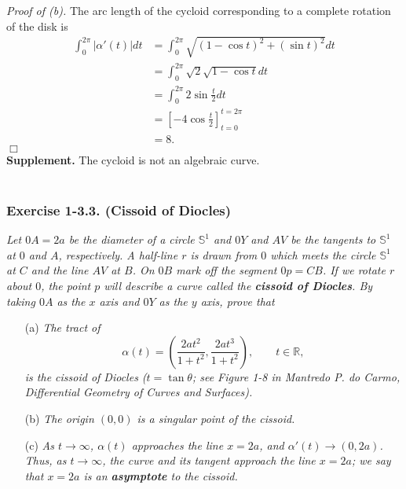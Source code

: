\documentclass{article}
\begin{document}
\emph{Proof of (b).}
The arc length of the cycloid corresponding to a complete rotation of the disk is
\begin{align*}
  \int_{0}^{2\pi} |\alpha'(t)| dt
  &= \int_{0}^{2\pi} \sqrt{(1-\cos t)^2 + (\sin t)^2} dt \\
  &= \int_{0}^{2\pi} \sqrt{2} \sqrt{1 - \cos t} dt \\
  &= \int_{0}^{2\pi} 2 \sin \frac{t}{2} dt \\
  &= \left[ -4 \cos\frac{t}{2} \right]_{t=0}^{t=2\pi} \\
  &= 8.
\end{align*}
$\Box$ \\

\textbf{Supplement.}
The cycloid is not an algebraic curve. \\\\






\subsubsection*{Exercise 1-3.3. (Cissoid of Diocles)}
\emph{Let $0A = 2a$ be the diameter of a circle $\mathbb{S}^1$ and
$0Y$ and $AV$ be the tangents to $\mathbb{S}^1$ at $0$ and $A$, respectively.
A half-line $r$ is drawn from $0$ which
meets the circle $\mathbb{S}^1$ at $C$ and the line $AV$ at $B$.
On $0B$ mark off the segment $0p = CB$.
If we rotate $r$ about $0$, the point $p$ will describe a curve called
the \textbf{cissoid of Diocles}.
By taking $0A$ as the $x$ axis and $0Y$ as the $y$ axis, prove that}
\begin{enumerate}
\item[(a)]
  \emph{The tract of
  \[
    \alpha(t) = \left( \frac{2at^2}{1+t^2}, \frac{2at^3}{1+t^2} \right),
    \qquad
    t \in \mathbb{R},
  \]
  is the cissoid of Diocles ($t = \tan\theta$;
  see Figure 1-8 in Mantredo P. do Carmo, Differential Geometry of Curves and Surfaces).}

\item[(b)]
  \emph{The origin $(0,0)$ is a singular point of the cissoid.}

\item[(c)]
  \emph{As $t \to \infty$, $\alpha(t)$ approaches the line $x = 2a$,
  and $\alpha'(t) \to (0,2a)$.
  Thus, as $t \to \infty$, the curve and its tangent approach the line $x = 2a$;
  we say that $x = 2a$ is an \textbf{asymptote} to the cissoid.} \\
\end{enumerate}
\end{document}

